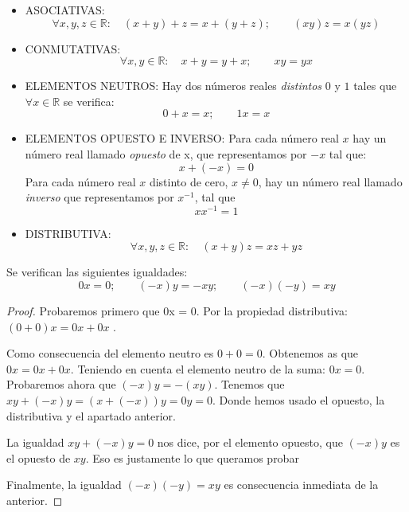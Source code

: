 	
		\begin{itemize}
		\item ASOCIATIVAS:  
			\begin{equation}
			\forall x,y,z  \in  \mathbb R: \quad
			(x+y)+z=x+(y+z);  \qquad (xy)z=x(yz)
			\end{equation}
	
		\item CONMUTATIVAS:  
			\begin{equation}
			\forall x,y  \in  \mathbb R: \quad
			x+y=y+x;  \qquad xy=yx
			\end{equation}
	
		\item ELEMENTOS NEUTROS:  Hay dos números reales \textit{distintos} $0$ y $1$ tales que $\forall x \in \mathbb R$ se verifica:
			\begin{equation}
		    0+x=x;  \qquad 1x=x
			\end{equation}
	
		\item ELEMENTOS OPUESTO E INVERSO:  Para cada número real $x$ hay un número real llamado \textit{opuesto} de x, que representamos por $-x$ tal que: 
			\begin{equation}
			x+(-x)=0
			\end{equation}
			Para cada número real $x$ distinto de cero, $x \neq 0$, hay un número real llamado \textit{inverso} que representamos por $x^{-1}$, tal que  
			\begin{equation}
			xx^{-1}=1
			\end{equation}
		\item DISTRIBUTIVA:  
			\begin{equation}
			\forall x,y,z  \in  \mathbb R: \quad
			(x+y)z=xz+yz
			\end{equation}
		\end{itemize}
	
		
	
		\begin{prop}
		Se verifican las siguientes igualdades:	
		\begin{equation}
		0x=0; \qquad (-x)y=-xy; \qquad (-x)(-y)=xy
		\end{equation}
		\end{prop}
	
		\begin{proof}
		
	 	Probaremos primero que 0x = 0. Por la propiedad distributiva:$(0 + 0)x = 0 x + 0 x$ . 
	 	
	 	
	 	Como consecuencia del elemento neutro es $0 + 0 = 0$. Obtenemos as que $0x=0x+0x$.
	 	Teniendo en cuenta el elemento neutro de la suma:  $0 x = 0$.
	 	Probaremos ahora que $(-x)y =  - (xy)$. Tenemos que $xy + (-x)y = (x + (-x))y = 0 y = 0$. Donde hemos usado el opuesto, la distributiva y el apartado anterior. 
		
		La igualdad $xy + (-x)y = 0$ nos dice, por el elemento opuesto, que $(-x)y$ es el opuesto de $xy$. Eso es justamente lo que queramos probar

		Finalmente, la igualdad $(-x)(-y) = xy$ es consecuencia inmediata de la anterior.
	
		\end{proof}

